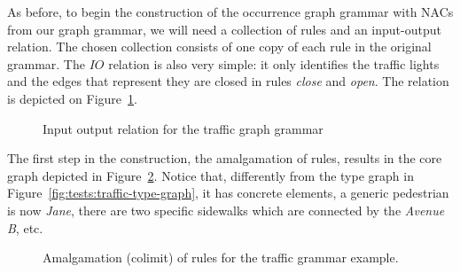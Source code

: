 As before, to begin the construction of the occurrence graph grammar with NACs from our graph grammar, we will need a collection of rules and an input-output relation. The chosen collection consists of one copy of each rule in the original grammar. The $IO$ relation is also very simple: it only identifies the traffic lights and the edges that represent they are closed in rules \emph{close} and \emph{open}. The relation is depicted on Figure~\ref{fig:tests:inout-traffic}.

\begin{figure}[!ht]
\centering
{}
\caption{Input output relation for the traffic graph grammar}\label{fig:tests:inout-traffic}
\end{figure}

The first step in the construction, the amalgamation of rules, results in the core graph depicted in Figure~\ref{fig:tests:amalgamation-traffic}. Notice that, differently from the type graph in Figure~\ref{fig:tests:traffic-type-graph}, it has concrete elements, a generic pedestrian is now \emph{Jane}, there are two specific sidewalks which are connected by the \emph{Avenue B}, etc.

\begin{figure}[!ht]
  \centering
  \caption{Amalgamation (colimit) of rules for the traffic grammar example.}\label{fig:tests:amalgamation-traffic}
\end{figure}


